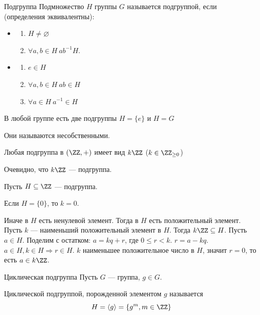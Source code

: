 \begin{defn}{Подгруппа}{}
    Подмножество \( H \) группы \( G \) называется подгруппой,
    если (определения эквивалентны):
    \begin{itemize}
        \item
            \begin{enumerate}
                \item
                    \( H \neq \varnothing \)
                \item
                    \( \forall a, b \in H \: ab^{-1} H \).
            \end{enumerate}
        \item
            \begin{enumerate}
                \item
                    \( e \in H\)
                \item
                    \( \forall a, b \in H \: ab \in H \)
                \item
                    \( \forall a \in H \: a^{-1} \in H \)
            \end{enumerate}
    \end{itemize}
\end{defn}

\begin{remark}{}{}
    В любой группе есть две подгруппы \( H = \{ e \} \) и \( H = G \)

    Они называются несобственными.
\end{remark}

\begin{prop}{}{}
    Любая подгруппа в \( (\ZZ, +) \) имеет вид \( k \ZZ \) (\( k \in \ZZ_{\geq 0} \))
\end{prop}

Очевидно, что \( k \ZZ \) --- подгруппа.

Пусть \( H \subseteq \ZZ \) --- подгруппа.

Если \( H = \{ 0 \} \), то \( k = 0 \).

Иначе в \( H \) есть ненулевой элемент.
Тогда в \( H \) есть положительный элемент.
Пусть \( k \) --- наименьший положительный элемент в \( H \).
Тогда \( k \ZZ \subseteq H \).
Пусть \( a \in H \).
Поделим с остатком: \( a = kq + r \), где \( 0 \leq r < k \).
\( r = a - kq \). \( a \in H, k \in H \Rightarrow r \in H \).
\( k \) наименьшее положительное число в \( H \), значит \( r = 0 \),
то есть \( a \in k \ZZ \).

\begin{defn}{Циклическая подгруппа}{}
    Пусть \( G \) --- группа, \( g \in G \).

    Циклической подгруппой,
    порожденной элементом \( g \) называется
    \[
        H = \langle g \rangle = \{ g^m, m \in \ZZ \}
    \]
\end{defn}

